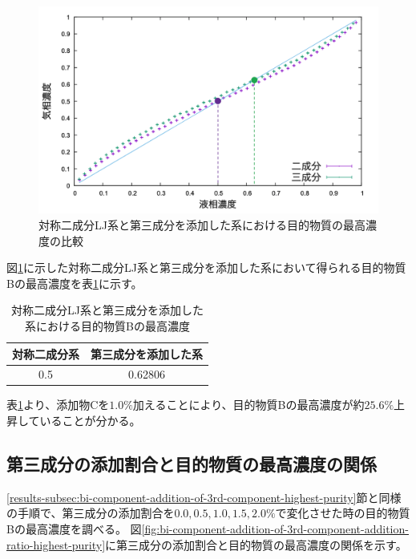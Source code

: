 \documentclass[titlepage]{jsreport}
\begin{document}
\begin{figure}[htbp]
    \begin{center}
        \includegraphics[width=14cm]{fig/highest-purity-difference-E2.0/highest-purity-difference-E2.0.png}
    \end{center}
    \caption{対称二成分LJ系と第三成分を添加した系における目的物質の最高濃度の比較}
    \label{fig:bi-component-addition-of-3rd-component-highest-purity}
\end{figure}

\newpage
図\ref{fig:bi-component-addition-of-3rd-component-highest-purity}に示した対称二成分LJ系と第三成分を添加した系において得られる目的物質Bの最高濃度を表\ref{table:bi-component-addition-of-3rd-component-highest-purity}に示す。

\begin{table}[htbp]
    \begin{center}
        \caption{対称二成分LJ系と第三成分を添加した系における目的物質Bの最高濃度}
        \label{table:bi-component-addition-of-3rd-component-highest-purity}
        \begin{tabular}{c c}
            対称二成分系 & 第三成分を添加した系 \\
            \hline
            0.5 & 0.62806 \\
        \end{tabular}
    \end{center}
\end{table}

表\ref{table:bi-component-addition-of-3rd-component-highest-purity}より、添加物Cを$1.0\%$加えることにより、目的物質Bの最高濃度が約$25.6\%$上昇していることが分かる。

\subsection{第三成分の添加割合と目的物質の最高濃度の関係} \label{results-subsec:bi-component-addition-of-3rd-component-addition-ratio-highest-purity}
\ref{results-subsec:bi-component-addition-of-3rd-component-highest-purity}節と同様の手順で、第三成分の添加割合を$0.0,0.5,1.0,1.5,2.0\%$で変化させた時の目的物質Bの最高濃度を調べる。
図\ref{fig:bi-component-addition-of-3rd-component-addition-ratio-highest-purity}に第三成分の添加割合と目的物質の最高濃度の関係を示す。
\end{document}
